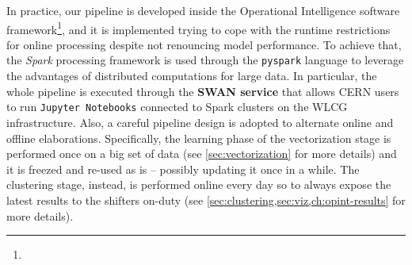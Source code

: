 In practice, our pipeline is developed inside the Operational Intelligence software framework\footnote{\githubpyspark}, and it is implemented trying to cope with the runtime restrictions for online processing despite not renouncing model performance.
To achieve that, the \textit{Spark} \cite{zaharia2010spark} processing framework is used through the \texttt{pyspark} language to leverage the advantages of distributed computations for large data. 
In particular, the whole pipeline is executed through the \textbf{SWAN service} \cite{piparo2018swan} that allows CERN users to run \texttt{Jupyter Notebooks} connected to Spark clusters on the WLCG infrastructure.
Also, a careful pipeline design is adopted to alternate online and offline elaborations.
Specifically, the learning phase of the vectorization stage is performed once on a big set of data (see \cref{sec:vectorization} for more details) and it is freezed and re-used as is -- possibly updating it once in a while.
The clustering stage, instead, is performed online every day so to always expose the latest results to the shifters on-duty (see %
\cref{sec:clustering,sec:viz,ch:opint-results}
for more details).
